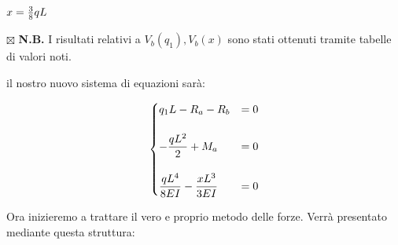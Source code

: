 \documentclass[a4paper,12pt, oneside]{book}
\begin{document}
	\phantom{.}
	
	$x=\frac{3}{8}qL\hfill$
	
	\phantom{.}
	
	$\boxtimes$ \textbf{N.B.} I risultati relativi a $V_b(q_1), V_b(x)$ sono stati ottenuti tramite tabelle di valori noti.
	
	\phantom{.}
	
	\phantom{.}
	
	il nostro nuovo sistema di equazioni sarà:
	
	\begin{equation}
		\centering
		\begin{cases}
			q_1L - R_a - R_b &= 0 \\ \\
			-\dfrac{qL^{2}}{2} + M_a &= 0 \\ \\
			\dfrac{qL^{4}}{8EI} - \dfrac{xL^{3}}{3EI} &=0\\	
		\end{cases}
	\end{equation}
	
	\phantom{.}
	
	Ora inizieremo a trattare il vero e proprio metodo delle forze. Verrà presentato mediante questa struttura:
	
	\begin{figure}[H]
		\centering
		\caption{}
		\label{fig:traveforzaaaa}
	\end{figure}
	
\end{document}

